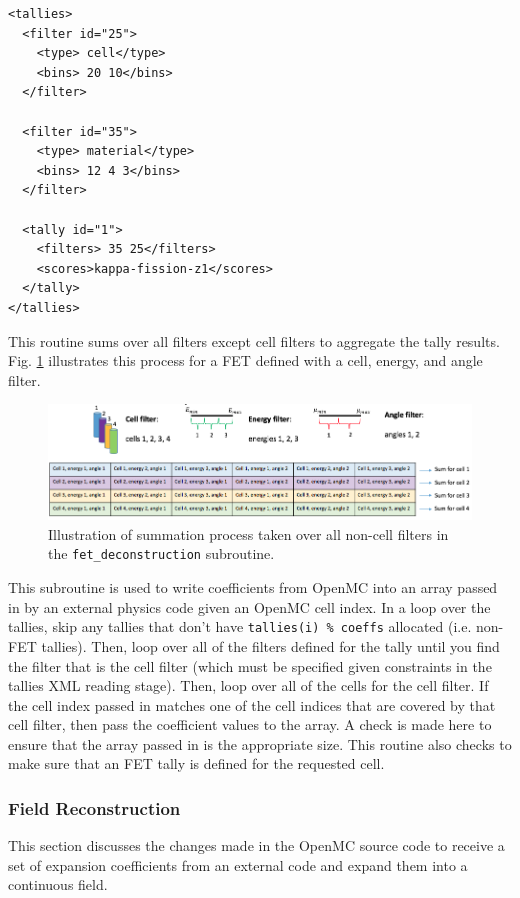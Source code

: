 \documentclass[10pt]{article}
\newcounter{subsubsubsection}[subsubsection]
\numberwithin{equation}{section} %
\begin{document}
\begin{lstlisting}
<tallies>
  <filter id="25">
    <type> cell</type>
    <bins> 20 10</bins>
  </filter>

  <filter id="35">
    <type> material</type>
    <bins> 12 4 3</bins>
  </filter>

  <tally id="1">
    <filters> 35 25</filters>
    <scores>kappa-fission-z1</scores>
  </tally>
</tallies>
\end{lstlisting}

This routine sums over all filters except cell filters to aggregate the tally results. Fig. \ref{fig:fet-deconstruction} illustrates this process for a FET defined with a cell, energy, and angle filter.

\begin{figure}[H]
\centering
\includegraphics[width=17.5cm]{figures/fet-deconstruction.png}
\caption{Illustration of summation process taken over all non-cell filters in the {\tt fet\_deconstruction} subroutine.}
\label{fig:fet-deconstruction}
\end{figure}

This subroutine is used to write coefficients from OpenMC into an array passed in by an external physics code given an OpenMC cell index. In a loop over the tallies, skip any tallies that don't have {\tt tallies(i) \% coeffs} allocated (i.e. non-FET tallies). Then, loop over all of the filters defined for the tally until you find the filter that is the cell filter (which must be specified given constraints in the tallies XML reading stage). Then, loop over all of the cells for the cell filter. If the cell index passed in matches one of the cell indices that are covered by that cell filter, then pass the coefficient values to the array. A check is made here to ensure that the array passed in is the appropriate size. This routine also checks to make sure that an FET tally is defined for the requested cell.

\subsubsection{Field Reconstruction}
This section discusses the changes made in the OpenMC source code to receive a set of expansion coefficients from an external code and expand them into a continuous field. 
\end{document}
